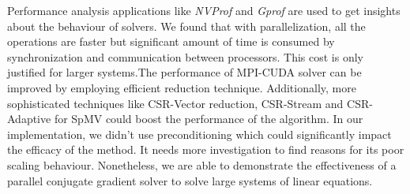 \documentclass[sigplan,screen]{acmart}
\begin{document}
Performance analysis applications like \emph{NVProf} and \emph{Gprof} are used to get insights about the behaviour of solvers. We found that with parallelization, all the operations are faster but significant amount of time is consumed by synchronization and communication between processors. This cost is only justified for larger systems.The performance of MPI-CUDA solver can be improved by employing efficient reduction technique. Additionally, more sophisticated techniques like CSR-Vector reduction, CSR-Stream and CSR-Adaptive for SpMV could boost the performance of the algorithm. In our implementation, we didn't use preconditioning which could significantly impact the efficacy of the method. It needs more investigation to find reasons for its poor scaling behaviour. Nonetheless, we are able to demonstrate the effectiveness of a parallel conjugate gradient solver to solve large systems of linear equations.  




\end{document}
